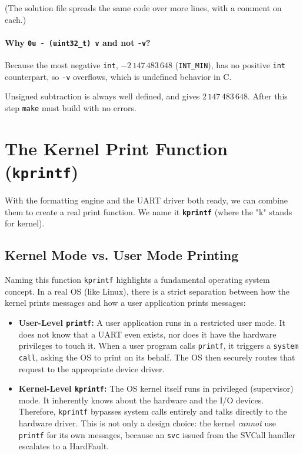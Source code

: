(The solution file spreads the same code over more lines, with a comment on each.)

\paragraph{Why \texttt{0u - (uint32\_t) v} and not \texttt{-v}?} 
Because the most negative \texttt{int}, $-2\,147\,483\,648$ (\texttt{INT\_MIN}), has no positive \texttt{int} counterpart, so \texttt{-v} overflows, which is undefined behavior in C. 

Unsigned subtraction is always well defined, and gives $2\,147\,483\,648$. After this step \texttt{make} must build with no errors.

\section{The Kernel Print Function (\texttt{kprintf})}
With the formatting engine and the UART driver both ready, we can combine them to create a real print function. We name it \textbf{\texttt{kprintf}} (where the "k" stands for kernel). 

\subsection{Kernel Mode vs. User Mode Printing}
Naming this function \texttt{kprintf} highlights a fundamental operating system concept. In a real OS (like Linux), there is a strict separation between how the kernel prints messages and how a user application prints messages:

\begin{itemize}
    \item \textbf{User-Level \texttt{printf}:} A user application runs in a restricted user mode. It does not know that a UART even exists, nor does it have the hardware privileges to touch it. When a user program calls \texttt{printf}, it triggers a \texttt{system call}, asking the OS to print on its behalf. The OS then securely routes that request to the appropriate device driver.
    \item \textbf{Kernel-Level \texttt{kprintf}:} The OS kernel itself runs in privileged (supervisor) mode. It inherently knows about the hardware and the I/O devices. Therefore, \texttt{kprintf} bypasses system calls entirely and talks directly to the hardware driver. This is not only a design choice: the kernel \emph{cannot} use \texttt{printf} for its own messages, because an \texttt{svc} issued from the SVCall handler escalates to a HardFault.
\end{itemize}

